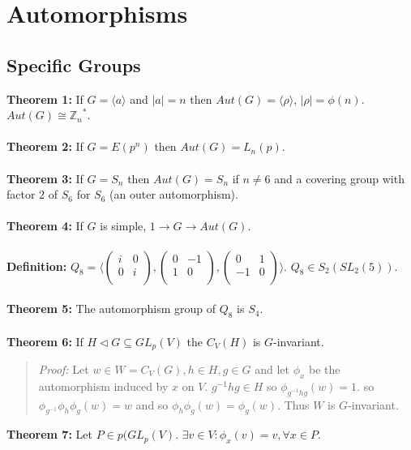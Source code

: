\chapter{Automorphisms}
\section {Specific Groups}
{\bf Theorem 1:}
If $G= \langle a \rangle $ and $|a|=n$ then $Aut(G)= \langle \rho \rangle $, $|\rho|= \phi(n)$.
$Aut(G) \cong {{\mathbb Z}_n}^*$.
\\
\\
{\bf Theorem 2:}
If $G= E(p^n)$ then $Aut(G)= L_n(p)$.
\\
\\
{\bf Theorem 3:}
If $G= S_n$ then $Aut(G)= S_n$ if $n \ne 6$ and a covering group with factor $2$ of $S_6$ for
$S_6$ (an outer automorphism).
\\
\\
{\bf Theorem 4:}
If $G$ is simple, $1 \rightarrow G \rightarrow Aut(G)$.
\\
\\
{\bf Definition:} $Q_8 = 
\langle 
\left(\begin{array} {cc}
i & 0\\
0 & i\\
\end{array}\right),
\left(\begin{array} {cc}
0 & -1\\
1 & 0\\
\end{array}\right),
\left(\begin{array} {cc}
0 & 1\\
-1 & 0\\
\end{array}\right)
\rangle$. $Q_8 \in S_2(SL_2(5))$.
\\
\\
{\bf Theorem 5:}  The automorphism group of $Q_8$ is $S_4$.
\\
\\
{\bf Theorem 6:} If $H \lhd G \subseteq GL_p(V)$ the $C_V(H)$ is $G$-invariant.
\begin{quote}
\emph{Proof:}
Let $w \in W = C_V(G), h \in H, g \in G$ and let $\phi_{x}$ be the automorphism
induced by $x$ on $V$.  $g^{-1} h g \in H$ so $\phi_{g^{-1} h g}(w) = 1$.
so $\phi_{g^{-1}} \phi_{h} \phi_{g} (w) = w$ and so $\phi_{h} \phi_{g} (w) = \phi_{g} (w)$.
Thus $W$ is $G$-invariant.
\end{quote}
{\bf Theorem 7:} Let $P \in p(GL_p(V)$.  $\exists v \in V: \phi_{x}(v)= v, \forall x \in P$.
